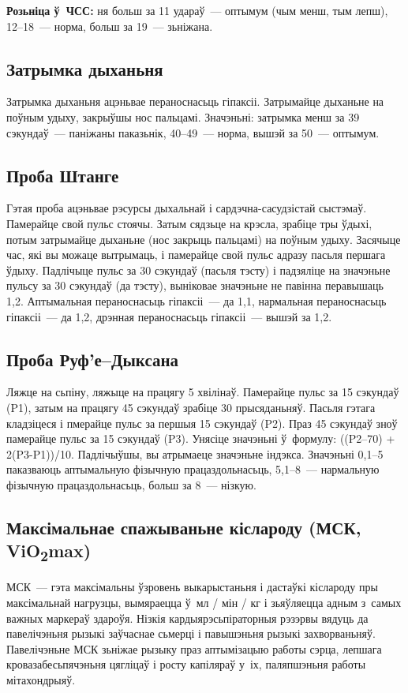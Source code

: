 \textbf{Розьніца ў~ЧСС:} ня больш за 11 удараў~--- оптымум (чым менш, тым лепш), 12--18~--- норма, больш за 19~--- зьніжана.

\subsection*{Затрымка дыханьня}

Затрымка дыханьня ацэньвае пераноснасьць гіпаксіі. Затрымайце дыханьне на поўным удыху, закрыўшы нос пальцамі. Значэньні: затрымка менш за 39 сэкундаў~--- паніжаны паказьнік, 40--49~--- норма, вышэй за 50~--- оптымум.

\subsection*{Проба Штанге}

Гэтая проба ацэньвае рэсурсы дыхальнай і сардэчна-сасудзістай сыстэмаў. Памерайце свой пульс стоячы. Затым сядзьце на крэсла, зрабіце тры ўдыхі, потым затрымайце дыханьне (нос закрыць пальцамі) на поўным удыху. Засячыце час, які вы можаце вытрымаць, і памерайце свой пульс адразу пасьля першага ўдыху. Падлічыце пульс за 30 сэкундаў (пасьля тэсту) і падзяліце на значэньне пульсу за 30 сэкундаў (да тэсту), выніковае значэньне не павінна перавышаць 1,2. Аптымальная пераноснасьць гіпаксіі~--- да 1,1, нармальная пераноснасьць гіпаксіі~--- да 1,2, дрэнная пераноснасьць гіпаксіі~--- вышэй за 1,2.

\subsection*{Проба Руф'е--Дыксана}

Ляжце на сьпіну, ляжыце на працягу 5 хвілінаў. Памерайце пульс за 15 сэкундаў (P1), затым на працягу 45 сэкундаў зрабіце 30 прысяданьняў. Пасьля гэтага кладзіцеся і пмерайце пульс за першыя 15 сэкундаў (P2). Праз 45 сэкундаў зноў памерайце пульс за 15 сэкундаў (P3). Унясіце значэньні ў~формулу: ((P2--70) + 2(P3-P1))/10. Падлічыўшы, вы атрымаеце значэньне індэкса. Значэньні 0,1--5 паказваюць аптымальную фізычную працаздольнасьць, 5,1--8~--- нармальную фізычную працаздольнасьць, больш за 8~--- нізкую.

\subsection*{Максімальнае спажываньне кіслароду (МСК, ViO\textsubscript{2}max)}

МСК~--- гэта максімальны ўзровень выкарыстаньня і дастаўкі кіслароду пры максімальнай нагрузцы, вымяраецца ў~мл / мін / кг і зьяўляецца адным з~самых важных маркераў здароўя. Нізкія кардыярэсьпіраторныя рэзэрвы вядуць да павелічэньня рызыкі заўчаснае сьмерці і павышэньня рызыкі захворваньняў. Павелічэньне МСК зьніжае рызыку праз аптымізацыю работы сэрца, лепшага кровазабесьпячэньня цягліцаў і росту капіляраў у~іх, паляпшэньня работы мітахондрыяў. 

